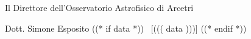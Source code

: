 \begin{flushright}
\begin{minipage}[c]{11cm}
\begin{center}
Il Direttore dell'Osservatorio Astrofisico di Arcetri

Dott. Simone Esposito ((* if data *)) ~[((( data )))] ((* endif *))
\end{center}
\end{minipage}
\end{flushright}
